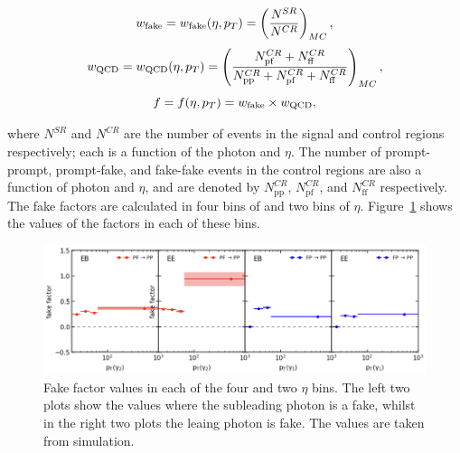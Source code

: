 \begin{equation*}
w_{\textrm{fake}} = w_{\textrm{fake}}(\eta,p_T)
= \left( \frac{N^{SR}} {N^{CR}} \right)_{MC} , 
\end{equation*}
\begin{equation*}
w_{\textrm{QCD}} = w_{\textrm{QCD}}(\eta,p_T)
= \left( \frac{N^{CR}_{\textrm{pf}} + N^{CR}_{\textrm{ff}}} {N^{CR}_{\textrm{pp}} + N^{CR}_{\textrm{pf}} + N^{CR}_{\textrm{ff}}} \right)_{MC} ,
\end{equation*}
\begin{equation*}
f = f(\eta,p_T) = w_{\textrm{fake}} \times w_{\textrm{QCD}} , 
\end{equation*}

where $N^{SR}$ and $N^{CR}$ are the number of events in the signal and control regions respectively;
each is a function of the photon \pt and $\eta$.
The number of prompt-prompt, prompt-fake, and fake-fake events in the control regions 
are also a function of photon \pt and $\eta$, 
and are denoted by $N^{CR}_{\textrm{pp}}$, $N^{CR}_{\textrm{pf}}$, and $N^{CR}_{\textrm{ff}}$ respectively.
The fake factors are calculated in four bins of \pt and two bins of $\eta$.
Figure~\ref{fig:cat_FakeFactors} shows the values of the factors in each of these bins.

\begin{figure}
  \centering
  \includegraphics[width=\textwidth]{Figures/Categorisation/fakeFactors.png}
  \caption[Values of the fake factors used in the data-driven dijet BDT method.]
  {
    Fake factor values in each of the four \pt and two $\eta$ bins.
    The left two plots show the values where the subleading photon is a fake, 
    whilst in the right two plots the leaing photon is fake.
    The values are taken from simulation.
  }
  \label{fig:cat_FakeFactors}
\end{figure}


